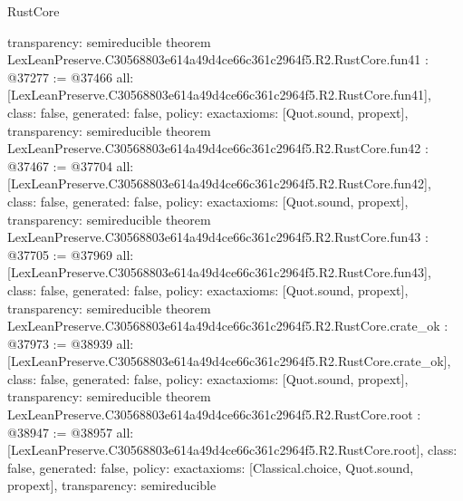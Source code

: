 \begin{lexlean}{RustCore}
\begin{coremodule}
{  transparency: semireducible
}
theorem LexLeanPreserve.C30568803e614a49d4ce66c361c2964f5.R2.RustCore.fun41 : @37277 := @37466 {
  all: [LexLeanPreserve.C30568803e614a49d4ce66c361c2964f5.R2.RustCore.fun41],
  class: false,
  generated: false,
  policy: exact{axioms: [Quot.sound, propext]},
  transparency: semireducible
}
theorem LexLeanPreserve.C30568803e614a49d4ce66c361c2964f5.R2.RustCore.fun42 : @37467 := @37704 {
  all: [LexLeanPreserve.C30568803e614a49d4ce66c361c2964f5.R2.RustCore.fun42],
  class: false,
  generated: false,
  policy: exact{axioms: [Quot.sound, propext]},
  transparency: semireducible
}
theorem LexLeanPreserve.C30568803e614a49d4ce66c361c2964f5.R2.RustCore.fun43 : @37705 := @37969 {
  all: [LexLeanPreserve.C30568803e614a49d4ce66c361c2964f5.R2.RustCore.fun43],
  class: false,
  generated: false,
  policy: exact{axioms: [Quot.sound, propext]},
  transparency: semireducible
}
theorem LexLeanPreserve.C30568803e614a49d4ce66c361c2964f5.R2.RustCore.crate_ok : @37973 := @38939 {
  all: [LexLeanPreserve.C30568803e614a49d4ce66c361c2964f5.R2.RustCore.crate_ok],
  class: false,
  generated: false,
  policy: exact{axioms: [Quot.sound, propext]},
  transparency: semireducible
}
theorem LexLeanPreserve.C30568803e614a49d4ce66c361c2964f5.R2.RustCore.root : @38947 := @38957 {
  all: [LexLeanPreserve.C30568803e614a49d4ce66c361c2964f5.R2.RustCore.root],
  class: false,
  generated: false,
  policy: exact{axioms: [Classical.choice, Quot.sound, propext]},
  transparency: semireducible
}


\end{coremodule}
\end{lexlean}
